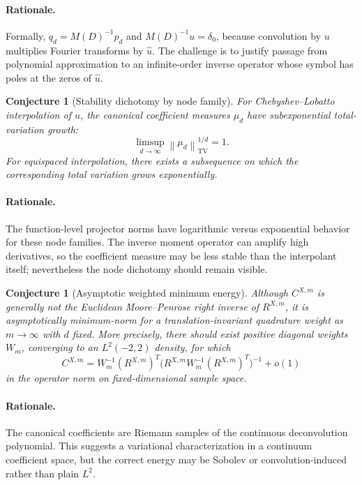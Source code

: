 \documentclass[11pt,oneside]{book}
\newtheorem{conjecture}[theorem]{Conjecture}
\theoremstyle{definition}
\theoremstyle{remark}
\newcommand{\norm}[1]{\left\lVert#1\right\rVert}
\begin{document}
\paragraph{Rationale.}
Formally, \(q_d=M(D)^{-1}p_d\) and \(M(D)^{-1}u=\delta_0\), because convolution by \(u\) multiplies Fourier transforms by \(\widehat u\).  The challenge is to justify passage from polynomial approximation to an infinite-order inverse operator whose symbol has poles at the zeros of \(\widehat u\).

\begin{conjecture}[Stability dichotomy by node family]
\label{conj:stability-dichotomy}
For Chebyshev--Lobatto interpolation of \(u\), the canonical coefficient measures \(\mu_d\) have subexponential total-variation growth:
\begin{equation}
 \limsup_{d\to\infty}\norm{\mu_d}_{\mathrm{TV}}^{1/d}=1.
 \label{eq:subexponential-tv}
\end{equation}
For equispaced interpolation, there exists a subsequence on which the corresponding total variation grows exponentially.
\end{conjecture}

\paragraph{Rationale.}
The function-level projector norms have logarithmic versus exponential behavior for these node families.  The inverse moment operator can amplify high derivatives, so the coefficient measure may be less stable than the interpolant itself; nevertheless the node dichotomy should remain visible.

\begin{conjecture}[Asymptotic weighted minimum energy]
\label{conj:min-energy}
Although \(C^{X,m}\) is generally not the Euclidean Moore--Penrose right inverse of \(R^{X,m}\), it is asymptotically minimum-norm for a translation-invariant quadrature weight as \(m\to\infty\) with \(d\) fixed.  More precisely, there should exist positive diagonal weights \(W_m\), converging to an \(L^2(-2,2)\) density, for which
\begin{equation}
 C^{X,m}=W_m^{-1}(R^{X,m})^T
 \bigl(R^{X,m}W_m^{-1}(R^{X,m})^T\bigr)^{-1}+o(1)
 \label{eq:weighted-pseudoinverse}
\end{equation}
in the operator norm on fixed-dimensional sample space.
\end{conjecture}

\paragraph{Rationale.}
The canonical coefficients are Riemann samples of the continuous deconvolution polynomial.  This suggests a variational characterization in a continuum coefficient space, but the correct energy may be Sobolev or convolution-induced rather than plain \(L^2\).
\end{document}
